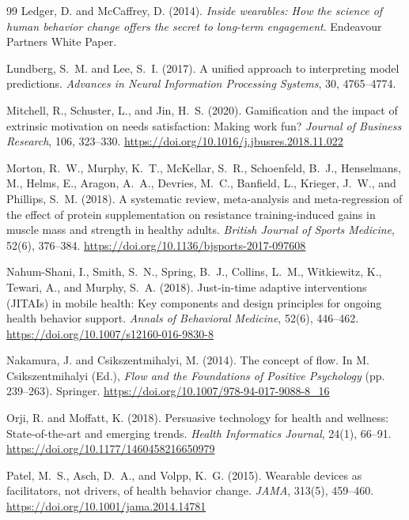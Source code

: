 \documentclass[12pt, a4paper]{report}
\begin{document}
\begin{thebibliography}{99}
Ledger, D. and McCaffrey, D. (2014).
\textit{Inside wearables: How the science of human behavior change offers the secret to long-term engagement}.
Endeavour Partners White Paper.

Lundberg, S.~M. and Lee, S.~I. (2017).
A unified approach to interpreting model predictions.
\textit{Advances in Neural Information Processing Systems}, 30, 4765--4774.

Mitchell, R., Schuster, L., and Jin, H.~S. (2020).
Gamification and the impact of extrinsic motivation on needs satisfaction: Making work fun?
\textit{Journal of Business Research}, 106, 323--330.
\url{https://doi.org/10.1016/j.jbusres.2018.11.022}

Morton, R.~W., Murphy, K.~T., McKellar, S.~R., Schoenfeld, B.~J., Henselmans, M., Helms, E., Aragon, A.~A., Devries, M.~C., Banfield, L., Krieger, J.~W., and Phillips, S.~M. (2018).
A systematic review, meta-analysis and meta-regression of the effect of protein supplementation on resistance training-induced gains in muscle mass and strength in healthy adults.
\textit{British Journal of Sports Medicine}, 52(6), 376--384.
\url{https://doi.org/10.1136/bjsports-2017-097608}

Nahum-Shani, I., Smith, S.~N., Spring, B.~J., Collins, L.~M., Witkiewitz, K., Tewari, A., and Murphy, S.~A. (2018).
Just-in-time adaptive interventions (JITAIs) in mobile health: Key components and design principles for ongoing health behavior support.
\textit{Annals of Behavioral Medicine}, 52(6), 446--462.
\url{https://doi.org/10.1007/s12160-016-9830-8}

Nakamura, J. and Csikszentmihalyi, M. (2014).
The concept of flow.
In M. Csikszentmihalyi (Ed.), \textit{Flow and the Foundations of Positive Psychology} (pp. 239--263). Springer.
\url{https://doi.org/10.1007/978-94-017-9088-8\_16}

Orji, R. and Moffatt, K. (2018).
Persuasive technology for health and wellness: State-of-the-art and emerging trends.
\textit{Health Informatics Journal}, 24(1), 66--91.
\url{https://doi.org/10.1177/1460458216650979}

Patel, M.~S., Asch, D.~A., and Volpp, K.~G. (2015).
Wearable devices as facilitators, not drivers, of health behavior change.
\textit{JAMA}, 313(5), 459--460.
\url{https://doi.org/10.1001/jama.2014.14781}


\end{thebibliography}
\end{document}

